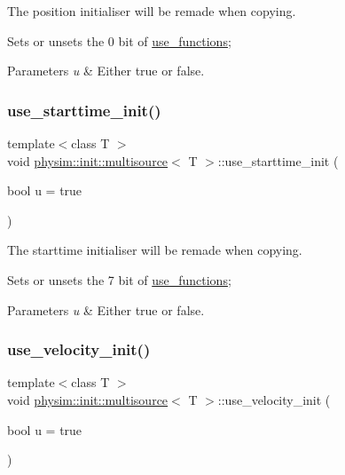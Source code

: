The position initialiser will be remade when copying. 

Sets or unsets the 0 bit of \hyperlink{classphysim_1_1init_1_1multisource_a12caae3f36b17cd343065aab62b62a8c}{use\+\_\+functions}; 
\begin{DoxyParams}{Parameters}
{\em u} & Either true or false. \\
\hline
\end{DoxyParams}
\mbox{\label{classphysim_1_1init_1_1multisource_af15a42abe4b6c8f842731d288c4cf71f}} 
\subsubsection{\texorpdfstring{use\+\_\+starttime\+\_\+init()}{use\_starttime\_init()}}
{\footnotesize\ttfamily template$<$class T $>$ \\
void \hyperlink{classphysim_1_1init_1_1multisource}{physim\+::init\+::multisource}$<$ T $>$\+::use\+\_\+starttime\+\_\+init (\begin{DoxyParamCaption}\item[{bool}]{u = {\ttfamily true} }\end{DoxyParamCaption})}



The starttime initialiser will be remade when copying. 

Sets or unsets the 7 bit of \hyperlink{classphysim_1_1init_1_1multisource_a12caae3f36b17cd343065aab62b62a8c}{use\+\_\+functions}; 
\begin{DoxyParams}{Parameters}
{\em u} & Either true or false. \\
\hline
\end{DoxyParams}
\mbox{\label{classphysim_1_1init_1_1multisource_ad62414d7308146311f5d7df177c31d8d}} 
\subsubsection{\texorpdfstring{use\+\_\+velocity\+\_\+init()}{use\_velocity\_init()}}
{\footnotesize\ttfamily template$<$class T $>$ \\
void \hyperlink{classphysim_1_1init_1_1multisource}{physim\+::init\+::multisource}$<$ T $>$\+::use\+\_\+velocity\+\_\+init (\begin{DoxyParamCaption}\item[{bool}]{u = {\ttfamily true} }\end{DoxyParamCaption})}



